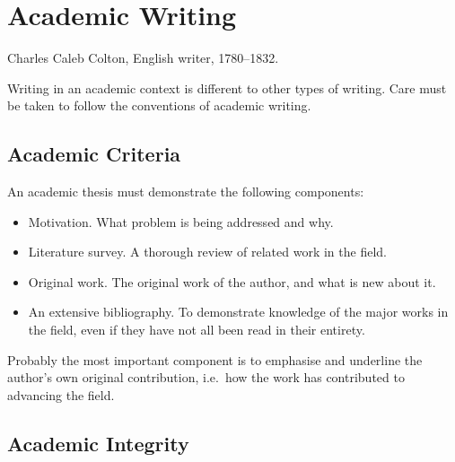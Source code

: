 %
%
% 
% 
% 


\chapter{Academic Writing}

\label{chap:Academic}


{
      Charles Caleb Colton, English writer, 1780--1832.
}



Writing in an academic context is different to other types of
writing. Care must be taken to follow the conventions of
academic writing.



\section{Academic Criteria}

An academic thesis must demonstrate the following components:
\begin{itemize}
      \item Motivation. What problem is being addressed and why.

      \item Literature survey. A thorough review of related work in the field.

      \item Original work. The original work of the author, and what is new
            about it.

      \item An extensive bibliography. To demonstrate knowledge of the major
            works in the field, even if they have not all been read in their
            entirety.
\end{itemize}
Probably the most important component is to emphasise and underline
the author's own original contribution, i.e.\ how the work has
contributed to advancing the field.



\section{Academic Integrity}

